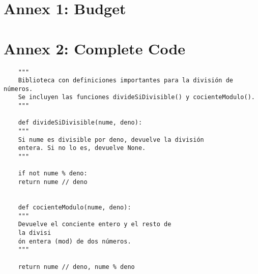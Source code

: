 \documentclass[10pt]{book}
\begin{document}
\frontmatter




\pagebreak


\tableofcontents
{}
\listoffigures
{}
\listoftables
{}


\newpage

\mainmatter


\newpage


\newpage


\newpage

%


\newpage


\newpage

%

%


\newpage

\newpage
\printbibliography[heading=bibintoc]

\backmatter
{}
\chapter{Annex 1: Budget}


\chapter{Annex 2: Complete Code}

\begin{verbatim}
	"""
	Biblioteca con definiciones importantes para la división de números.
	Se incluyen las funciones divideSiDivisible() y cocienteModulo().
	"""
	
	def divideSiDivisible(nume, deno):
	"""
	Si nume es divisible por deno, devuelve la división
	entera. Si no lo es, devuelve None.
	"""
	
	if not nume % deno:
	return nume // deno
	
	
	def cocienteModulo(nume, deno):
	"""
	Devuelve el conciente entero y el resto de
	la divisi
	ón entera (mod) de dos números.
	"""
	
	return nume // deno, nume % deno
	
\end{verbatim}


\inputminted[label={src/divisions.py},firstline=6,lastline=13]{python}{src/divisions.py}
\end{document}
